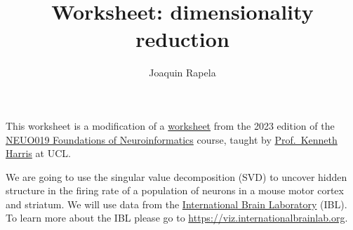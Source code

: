 \documentclass[12pt]{article}
\title{Worksheet: dimensionality reduction}
\author{Joaquin Rapela}
\begin{document}
\maketitle

This worksheet is a modification of a
\href{https://drive.google.com/file/d/1r90rlJpFKilQmNj1h27gmZdyi-RJeCq_/view}{worksheet}
from the 2023 edition of the
\href{https://www.ucl.ac.uk/cortexlab/neuroinformatics-class-page}{NEUO019
Foundations of Neuroinformatics} course, taught by
\href{https://profiles.ucl.ac.uk/31489}{Prof.~Kenneth Harris} at UCL.

We are going to use the singular value decomposition (SVD) to uncover hidden
structure in the firing rate of a population of neurons in a mouse motor cortex
and striatum.
%
We will use data from the
\href{https://www.internationalbrainlab.com/}{International Brain Laboratory}
(IBL). To learn more about the IBL please go to \url{https://viz.internationalbrainlab.org}.
\end{document}
